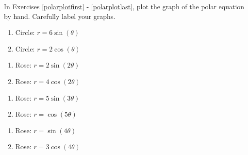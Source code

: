 \documentclass{ximera}
\begin{document}
	\author{Stitz-Zeager}


In Exercises \ref{polarplotfirst} - \ref{polarplotlast}, plot the graph of the polar equation by hand.  Carefully label your graphs.

\begin{multicols}{2}

\begin{enumerate}

\item Circle: $r = 6\sin(\theta)$ \label{polarplotfirst}
\item Circle: $r = 2\cos(\theta)$ 

\setcounter{HW}{\value{enumi}}

\end{enumerate}

\end{multicols}

\begin{multicols}{2} 

\begin{enumerate}

\setcounter{enumi}{\value{HW}}

\item Rose: $r = 2\sin(2\theta)$ 
\item Rose: $r = 4\cos(2\theta)$ 

\setcounter{HW}{\value{enumi}}

\end{enumerate}

\end{multicols}

\begin{multicols}{2} 

\begin{enumerate}

\setcounter{enumi}{\value{HW}}

\item Rose: $r = 5\sin(3\theta)$ 
\item Rose: $r = \cos(5\theta)$ 

\setcounter{HW}{\value{enumi}}

\end{enumerate}

\end{multicols}

\begin{multicols}{2} 

\begin{enumerate}

\setcounter{enumi}{\value{HW}}

\item Rose: $r = \sin(4\theta)$ 
\item Rose: $r = 3\cos(4\theta)$ \label{roseexercise8petal}

\setcounter{HW}{\value{enumi}}

\end{enumerate}

\end{multicols}
\end{document}
